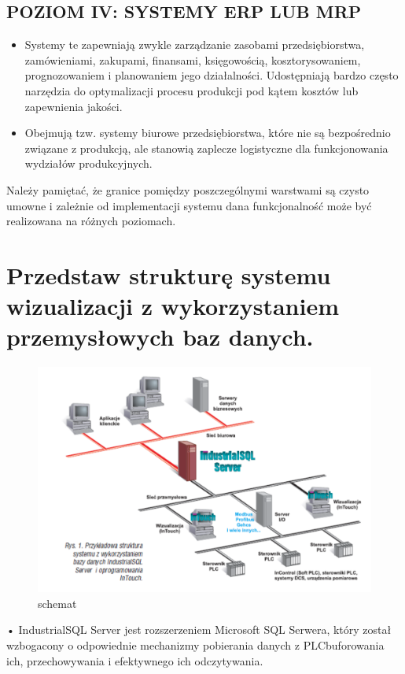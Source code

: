 \documentclass{article}
\begin{document}
       \subsection{POZIOM IV: SYSTEMY ERP LUB MRP}
       	
       	\begin{itemize}
       	\item Systemy te zapewniają zwykle zarządzanie zasobami przedsiębiorstwa,
       	zamówieniami, zakupami, finansami, księgowością, kosztorysowaniem,
       	prognozowaniem i planowaniem jego działalności. Udostępniają bardzo często
       	narzędzia do optymalizacji procesu produkcji pod kątem kosztów lub
       	zapewnienia jakości.
       	\item Obejmują tzw. systemy biurowe przedsiębiorstwa, które nie są bezpośrednio
       	związane z produkcją, ale stanowią zaplecze logistyczne dla funkcjonowania
       	wydziałów produkcyjnych.
       	       	\end{itemize}
       	Należy pamiętać, że granice pomiędzy poszczególnymi warstwami są czysto
       	umowne i zależnie od implementacji systemu dana funkcjonalność może być
       	realizowana na różnych poziomach.
       	
	\section{Przedstaw strukturę systemu wizualizacji z wykorzystaniem przemysłowych baz	danych.}
	\begin{figure}[!htb]
		\centering
		\includegraphics[width=0.7\linewidth]{industrialSQL}
		\caption{schemat}
		\label{fig:industrialsql}
	\end{figure}
	
	• IndustrialSQL Server jest rozszerzeniem Microsoft SQL Serwera, który
	został wzbogacony o odpowiednie mechanizmy pobierania danych z PLCbuforowania ich, przechowywania i efektywnego ich odczytywania.
	
\end{document}

